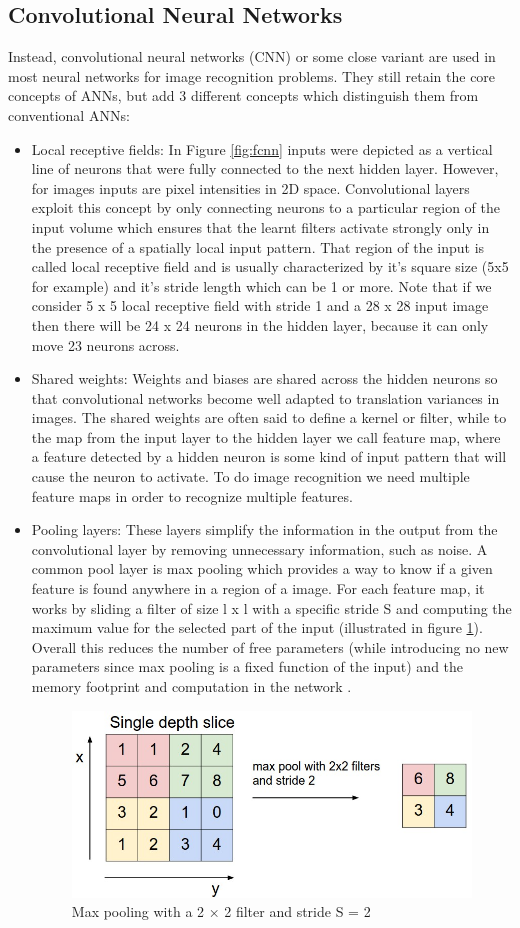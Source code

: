 \subsection{Convolutional Neural Networks}
Instead, convolutional neural networks (\ac{CNN}) or some close variant are used in most neural networks for image recognition problems\cite{Nielsen2017a}. They still retain the core concepts of \ac{ANN}s, but add 3 different concepts which distinguish them from conventional \ac{ANN}s:
\begin{itemize}
\item Local receptive fields: In Figure \ref{fig:fcnn} inputs were depicted as a vertical line of neurons that were fully connected to the next hidden layer. However, for images inputs are pixel intensities in 2D space. Convolutional layers exploit this concept by only connecting neurons to a particular region of the input volume which ensures that the learnt filters activate strongly only in the presence of a spatially local input pattern. That region of the input is called local receptive field and is usually characterized by it's square size (5x5 for example) and it's stride length which can be 1 or more. Note that if we consider 5 x 5  local receptive field with stride 1 and a 28 x 28 input image then there will be 24 x 24  neurons in the hidden layer, because it can only move 23 neurons across.  
\item Shared weights: Weights and biases are shared across the hidden neurons so that convolutional networks become well adapted to translation variances in images. The shared weights are often said to define a kernel or filter, while to the map from the input layer to the hidden layer we call feature map, where a feature detected by a hidden neuron is some kind of input pattern that will cause the neuron to activate. To do image recognition we need multiple feature maps in order to recognize multiple features.
\item Pooling layers: These layers simplify the information in the output from the convolutional layer by removing unnecessary information, such as noise. A common pool layer is max pooling which provides a way to know if a given feature is found anywhere in a region of a image. For each feature map, it works by sliding a filter of size l x l with a specific stride S and computing the maximum value for the selected part of the input (illustrated in figure \ref{fig:maxpooling}). Overall this reduces the number of free parameters (while introducing no new parameters since max pooling is a fixed function of the input) and the memory footprint and computation in the network \cite{Nielsen2017a}.
\begin{figure}[ht]
  \centering
    \includegraphics[width=0.5\linewidth]{figs/maxpooling.png}
  \caption{Max pooling with a 2 × 2 filter and stride S = 2 \cite{Nielsen2017a}}
  \label{fig:maxpooling}
\end{figure}
\end{itemize}
